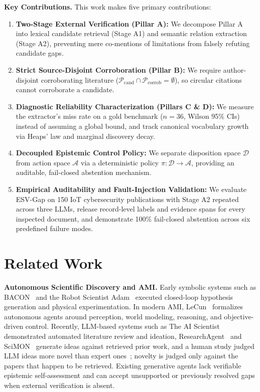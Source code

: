 \documentclass[runningheads]{llncs}
\newcommand{\method}{ESV-Gap}
\begin{document}
\noindent\textbf{Key Contributions.} This work makes five primary contributions:
\begin{enumerate}\setlength{\itemsep}{0pt}\setlength{\topsep}{2pt}\setlength{\parsep}{0pt}\setlength{\partopsep}{0pt}
  \item \textbf{Two-Stage External Verification (Pillar A):} We decompose Pillar A into lexical candidate retrieval (Stage A1) and semantic relation extraction (Stage A2), preventing mere co-mentions of limitations from falsely refuting candidate gaps.
  \item \textbf{Strict Source-Disjoint Corroboration (Pillar B):} We require author-disjoint corroborating literature ($\mathcal{P}_{\text{cand}} \cap \mathcal{P}_{\text{corrob}} = \emptyset$), so circular citations cannot corroborate a candidate.
  \item \textbf{Diagnostic Reliability Characterization (Pillars C \& D):} We measure the extractor's miss rate on a gold benchmark ($n=36$, Wilson 95\% CIs) instead of assuming a global bound, and track canonical vocabulary growth via Heaps' law and marginal discovery decay.
  \item \textbf{Decoupled Epistemic Control Policy:} We separate disposition space $\mathcal{D}$ from action space $\mathcal{A}$ via a deterministic policy $\pi: \mathcal{D} \rightarrow \mathcal{A}$, providing an auditable, fail-closed abstention mechanism.
  \item \textbf{Empirical Auditability and Fault-Injection Validation:} We evaluate \method{} on 150 IoT cybersecurity publications with Stage A2 repeated across three LLMs, release record-level labels and evidence spans for every inspected document, and demonstrate 100\% fail-closed abstention across six predefined failure modes.
\end{enumerate}

\section{Related Work}
\label{sec:related}

\noindent\textbf{Autonomous Scientific Discovery and AMI.} Early symbolic systems such as BACON~\cite{langley1987} and the Robot Scientist Adam~\cite{king2009automation} executed closed-loop hypothesis generation and physical experimentation. In modern AMI, LeCun~\cite{lecun2022path} formalizes autonomous agents around perception, world modeling, reasoning, and objective-driven control. Recently, LLM-based systems such as The AI Scientist~\cite{aiscientist2024} demonstrated automated literature review and ideation, ResearchAgent~\cite{baek2025researchagent} and SciMON~\cite{wang2024scimon} generate ideas against retrieved prior work, and a human study judged LLM ideas more novel than expert ones~\cite{si2025ideas}; novelty is judged only against the papers that happen to be retrieved. Existing generative agents lack verifiable epistemic self-assessment and can accept unsupported or previously resolved gaps when external verification is absent.
\end{document}
